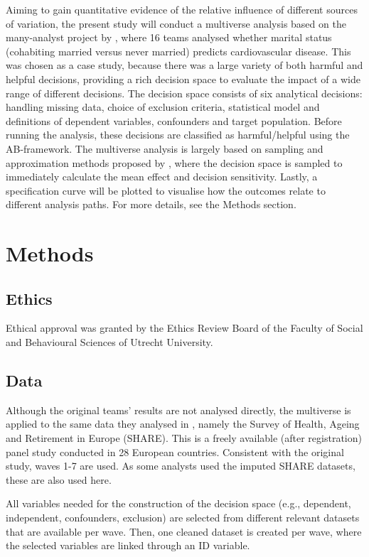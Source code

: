 \documentclass{article}
\begin{document}
Aiming to gain quantitative evidence of the relative influence of different sources of variation, the present study will conduct a multiverse analysis based on the many-analyst project by \citet{kowall_marital_2025}, where 16 teams analysed whether marital status (cohabiting married versus never married) predicts cardiovascular disease. This was chosen as a case study, because there was a large variety of both harmful and helpful decisions, providing a rich decision space to evaluate the impact of a wide range of different decisions. The decision space consists of six analytical decisions: handling missing data, choice of exclusion criteria, statistical model and definitions of dependent variables, confounders and target population. Before running the analysis, these decisions are classified as harmful/helpful using the AB-framework. The multiverse analysis is largely based on sampling and approximation methods proposed by \citet{liu_approximation_2023}, where the decision space is sampled to immediately calculate the mean effect and decision sensitivity. Lastly, a specification curve will be plotted to visualise how the outcomes relate to different analysis paths. For more details, see the Methods section.

\section*{Methods}
\subsection*{Ethics}
Ethical approval was granted by the Ethics Review Board of the Faculty of Social and Behavioural Sciences of Utrecht University. 

\subsection*{Data} 
Although the original teams’ results are not analysed directly, the multiverse is applied to the same data they analysed in \citet{kowall_marital_2025}, namely the Survey of Health, Ageing and Retirement in Europe (SHARE). This is a freely available (after registration) panel study conducted in 28 European countries. Consistent with the original study, waves 1-7 are used. As some analysts used the imputed SHARE datasets, these are also used here.

All variables needed for the construction of the decision space (e.g., dependent, independent, confounders, exclusion) are selected from different relevant datasets that are available per wave. Then, one cleaned dataset is created per wave, where the selected variables are linked through an ID variable. 
\end{document}
